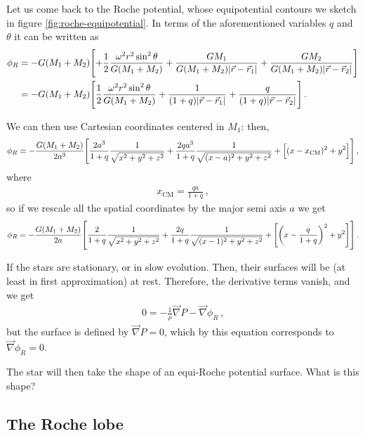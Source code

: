 \documentclass[main.tex]{subfiles}
\begin{document}
Let us come back to the Roche potential, whose equipotential contours we sketch in figure \ref{fig:roche-equipotential}. 
In terms of the aforementioned variables \(q\) and \(\theta \) it can be written as
%
\begin{align}
\phi _R &=  
- G (M_1 + M_2 ) \qty[ + \frac{1}{2} \frac{\omega^2 r^2 \sin^2\theta }{G (M_1 + M_2 )}
+ \frac{GM_1 }{G (M_1 + M_2 ) \abs{\vec{r} - \vec{r}_1 }}
+ \frac{GM_2 }{G (M_1 + M_2 ) \abs{\vec{r} - \vec{r}_2 }}
 ]  \\
 &= - G (M_1 + M_2 )
 \qty[
     \frac{1}{2} \frac{\omega^2r^2 \sin^2\theta }{G(M_1 + M_2 )} 
     + \frac{1}{(1 + q) \abs{\vec{r} - \vec{r}_1}}
     + \frac{q}{(1 + q) \abs{\vec{r} - \vec{r}_2}}
 ]
\,.
\end{align}

We can then use Cartesian coordinates centered in \(M_1 \): 
then, 
%
\begin{align}
\phi _R = - \frac{G (M_1 + M_2  )}{2 a^3}
\qty[ \frac{2 a^3}{1 + q}
\frac{1}{\sqrt{x^2 +y^2 +z^2}}
+
\frac{2 q a^3}{1 + q} 
\frac{1}{\sqrt{(x-a)^2 + y^2 +z^2}}
+ \qty[(x - x _{\text{CM}})^2 + y^2]
]
\,,
\end{align}
%
where 
%
\begin{align}
x _{\text{CM}} = \frac{qa}{1 + q}
\,,
\end{align}
%
so if we rescale all the spatial coordinates by the major semi axis \(a\) we get 
%
\begin{align}
\phi _R = - \frac{G (M_1 + M_2 )}{2a}
\qty[
\frac{2}{1 +q}
\frac{1}{\sqrt{x^2 +y^2 +z^2}} 
+
\frac{2 q}{1 + q} 
\frac{1}{\sqrt{(x-1)^2 + y^2 + z^2}}
+ \qty[\qty(x - \frac{q}{1 + q})^2 + y^2]
]
\,.
\end{align}

If the stars are stationary, or in slow evolution. Then, their surfaces will be (at least in first approximation) at rest. Therefore, the derivative terms vanish, and we get 
%
\begin{align}
0  = - \frac{1}{\rho } \vec{\nabla} P - \vec{\nabla} \phi _R
\,,
\end{align}
%
but the surface is defined by \(\vec{\nabla} P = 0\), which by this equation corresponds to \(\vec{\nabla} \phi _R = 0\). 

The star will then take the shape of an equi-Roche potential surface. 
What is this shape? 


\subsection{The Roche lobe}
\end{document}
